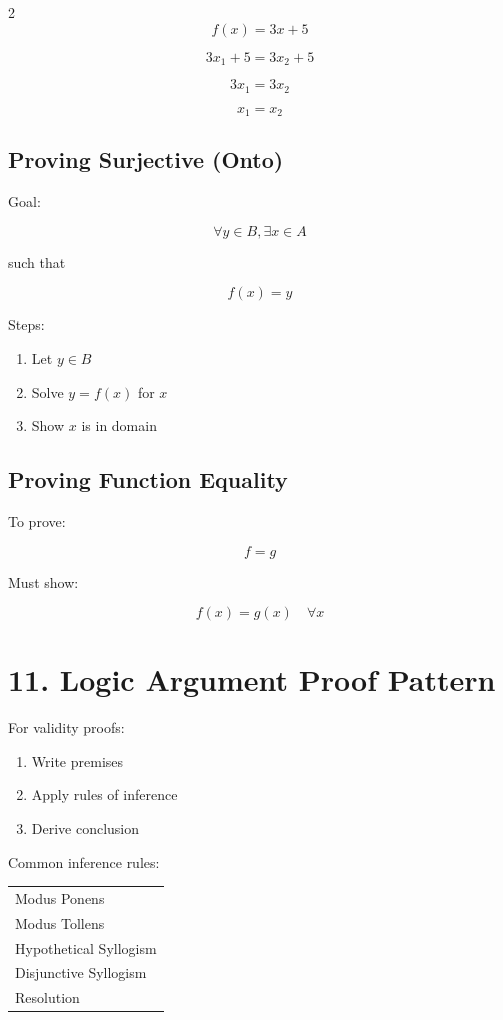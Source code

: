 \documentclass[10pt]{article}
\begin{document}
\begin{multicols}{2}
\[
f(x)=3x+5
\]

\[
3x_1+5 = 3x_2+5
\]

\[
3x_1 = 3x_2
\]

\[
x_1=x_2
\]

\subsection*{Proving Surjective (Onto)}

Goal:

\[
\forall y \in B, \exists x \in A
\]

such that

\[
f(x)=y
\]

Steps:

\begin{enumerate}
\item Let $y \in B$
\item Solve $y=f(x)$ for $x$
\item Show $x$ is in domain
\end{enumerate}

\subsection*{Proving Function Equality}

To prove:

\[
f = g
\]

Must show:

\[
f(x)=g(x) \quad \forall x
\]

\section*{11. Logic Argument Proof Pattern}

For validity proofs:

\begin{enumerate}
\item Write premises
\item Apply rules of inference
\item Derive conclusion
\end{enumerate}

Common inference rules:

\begin{tabular}{l}
Modus Ponens \\
Modus Tollens \\
Hypothetical Syllogism \\
Disjunctive Syllogism \\
Resolution
\end{tabular}

\end{multicols}
\end{document}
